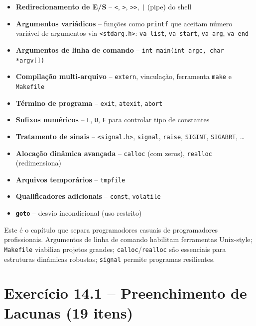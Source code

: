 \documentclass[12pt,a4paper]{article}
\begin{document}
\begin{itemize}[noitemsep]
  \item \textbf{Redirecionamento de E/S} -- \texttt{<}, \texttt{>}, \texttt{>>},
  \texttt{|} (pipe) do shell
  \item \textbf{Argumentos variádicos} -- funções como \texttt{printf} que aceitam
  número variável de argumentos via \texttt{<stdarg.h>}: \texttt{va\_list},
  \texttt{va\_start}, \texttt{va\_arg}, \texttt{va\_end}
  \item \textbf{Argumentos de linha de comando} -- \texttt{int main(int argc, char *argv[])}
  \item \textbf{Compilação multi-arquivo} -- \texttt{extern}, vinculação, ferramenta
  \texttt{make} e \texttt{Makefile}
  \item \textbf{Término de programa} -- \texttt{exit}, \texttt{atexit}, \texttt{abort}
  \item \textbf{Sufixos numéricos} -- \texttt{L}, \texttt{U}, \texttt{F} para
  controlar tipo de constantes
  \item \textbf{Tratamento de sinais} -- \texttt{<signal.h>}, \texttt{signal},
  \texttt{raise}, \texttt{SIGINT}, \texttt{SIGABRT}, \ldots
  \item \textbf{Alocação dinâmica avançada} -- \texttt{calloc} (com zeros),
  \texttt{realloc} (redimensiona)
  \item \textbf{Arquivos temporários} -- \texttt{tmpfile}
  \item \textbf{Qualificadores adicionais} -- \texttt{const}, \texttt{volatile}
  \item \textbf{\texttt{goto}} -- desvio incondicional (uso restrito)
\end{itemize}

\begin{boaprática}
  Este é o capítulo que separa programadores casuais de programadores
  profissionais. Argumentos de linha de comando habilitam ferramentas Unix-style;
  \texttt{Makefile} viabiliza projetos grandes; \texttt{calloc}/\texttt{realloc}
  são essenciais para estruturas dinâmicas robustas; \texttt{signal} permite
  programas resilientes.
\end{boaprática}

\tableofcontents\newpage

\section{Exercício 14.1 -- Preenchimento de Lacunas (19 itens)}
\end{document}
